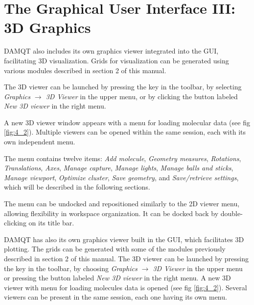 \documentclass[10pt]{article}
\begin{document}
\newpage

\section{The Graphical User Interface III: 3D Graphics \label{sec:4}}

DAMQT also includes its own graphics viewer integrated into the  
GUI, facilitating 3D visualization. Grids for visualization can be generated  
using various modules described in section 2 of this manual.  

The 3D viewer can be launched by pressing the key \bigtoolbV in the toolbar, by selecting  
{\it Graphics $\rightarrow$ 3D Viewer} in the upper menu, or by clicking the button labeled  
{\it New 3D viewer} in the right menu.  

A new 3D viewer window appears with a menu for loading molecular data (see fig \ref{fig:4_2}).  
Multiple viewers can be opened within the same session, each with its own independent menu.  

\vspace*{5mm}{\bf 3D Viewer Menu Options}\vspace*{5mm}  

The menu contains twelve items: {\it Add molecule}, {\it Geometry measures}, {\it Rotations},  
{\it Translations}, {\it Axes}, {\it Manage capture}, {\it Manage lights}, {\it Manage balls and sticks},  
{\it Manage viewport}, {\it Optimize cluster}, {\it Save geometry}, and {\it Save/retrieve settings},  
which will be described in the following sections.  

\vspace*{5mm}{\bf Menu Docking and Undocking}\vspace*{5mm}  

The menu can be undocked and repositioned similarly to the 2D viewer menu,  
allowing flexibility in workspace organization. It can be docked back by double-clicking  
on its title bar.  


DAMQT has also its own graphics viewer built in the
GUI, which facilitates 3D plotting. The grids can be generated with  some of
the modules previously described in section 2 of this manual. 
The 3D viewer can be launched by pressing the key \bigtoolbV in the toolbar, by choosing {\it 
Graphics $\rightarrow$ 3D Viewer} in the upper menu or pressing the button labeled {\it New 3D 
viewer} in the right menu.
A new 3D viewer with menu for loading molecules data is opened (see fig \ref{fig:4_2}). 
Several viewers can be present in the same session, each one having its own menu.
\end{document}
